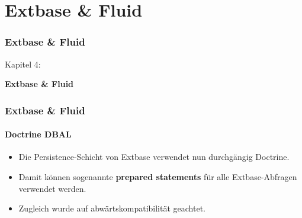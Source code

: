 %

\section{Extbase \& Fluid}
\begin{frame}[fragile]
	\frametitle{Extbase \& Fluid}

	\begin{center}\huge{Kapitel 4:}\end{center}
	\begin{center}\huge{\color{typo3darkgrey}\textbf{Extbase \& Fluid}}\end{center}

\end{frame}


\begin{frame}[fragile]
	\frametitle{Extbase \& Fluid}
	\framesubtitle{Doctrine DBAL}

	\begin{itemize}

		\item Die Persistence-Schicht von Extbase verwendet nun durchgängig Doctrine.
		\item Damit können sogenannte \textbf{prepared statements} für alle Extbase-Abfragen verwendet werden.
		\item Zugleich wurde auf abwärtskompatibilität geachtet.

	\end{itemize}

\end{frame}

